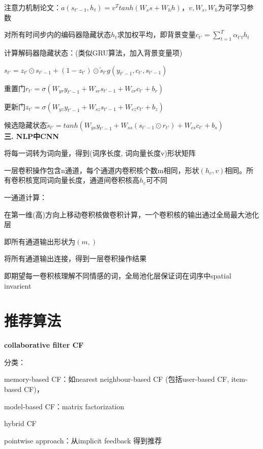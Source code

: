 \documentclass[UTF8]{ctexart}
\begin{document}
  \quad \quad \quad 注意力机制论文：$a(s_{t'-1}, h_t) = v^Ttanh(W_ss + W_hh)$，$v, W_s, W_h$为可学习参数

  \quad 对所有时间步内的编码器隐藏状态$h_t$求加权平均，即背景变量$c_{t'} = \sum_{t=1}^{T}\alpha_{t't}h_t$

  计算解码器隐藏状态：(类似GRU算法，加入背景变量项)
  
  \quad $s_{t'} = z_{t'} \odot s_{t'-1} + (1-z_{t'}) \odot \tilde{s}_{t'}g(y_{t'-1}, c_{t'}, s_{t'-1})$

  \quad \quad 重置门$r_{t'} = \sigma(W_{yr}y_{t'-1} + W_{sr}s_{t'-1} + W_{cr}c_{t'} + b_r)$
  
  \quad \quad 更新门$z_{t'} = \sigma(W_{yz}y_{t'-1} + W_{sz}s_{t'-1} + W_{cz}c_{t'} + b_z)$

  \quad \quad 候选隐藏状态$\tilde{s}_{t'} = tanh(W_{ys}y_{t'-1} + W_{ss}(s_{t'-1} \odot r_{t'}) + W_{cs}c_{t'} + b_s)$\\
\textbf{三. NLP中CNN}

  将每一词转为词向量，得到(词序长度, 词向量长度v)形状矩阵

  一层卷积操作包含n通道，每个通道内卷积核个数m相同，形状$(h_c, v)$相同。所有卷积核宽同词向量长度，通道间卷积核高$h_c$可不同

  一通道计算：

  \quad 在第一维(高)方向上移动卷积核做卷积计算，一个卷积核的输出通过全局最大池化层

  \quad 即所有通道输出形状为$(m, )$

  将所有通道输出连接，得到一层卷积操作结果

  即期望每一卷积核理解不同情感的词，全局池化层保证词在词序中spatial invarient

\section{推荐算法}
\noindent \textbf{collaborative filter CF}

  分类：
  
  \quad memory-based CF：如nearest neighbour-based CF (包括user-based CF, item-based CF)，
  
  \quad model-based CF：matrix factorization 
  
  \quad hybrid CF

  \quad pointwise approach：从implicit feedback 得到推荐
\end{document}
